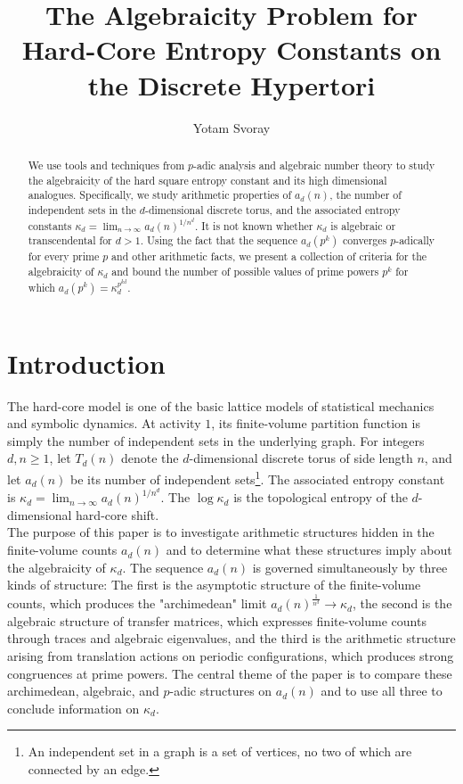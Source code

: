 \documentclass{article}
\title{The Algebraicity Problem for Hard-Core Entropy Constants on the Discrete Hypertori}
\author{Yotam Svoray}
\date{ }
\theoremstyle{plain}
\theoremstyle{definition}
\theoremstyle{remark}
\begin{document}
\maketitle

\begin{abstract}
 We use tools and techniques from $p$-adic analysis and algebraic number theory to study the algebraicity of the hard square entropy constant and its high dimensional analogues. Specifically, we study arithmetic properties of $a_d(n)$, the number of independent sets in the $d$-dimensional discrete torus, and the associated entropy constants $\kappa_d=\lim_{n\to\infty}a_d(n)^{1/n^d}$. It is not known whether $\kappa_d$ is algebraic or transcendental for $d>1$. Using the fact that the sequence $a_d(p^k)$ converges $p$-adically for every prime $p$ and other arithmetic facts, we present a collection of criteria for the algebraicity of $\kappa_d$ and bound the number of possible values of prime powers $p^k$ for which $a_d(p^k)=\kappa_d^{p^{kd}}$. 
\end{abstract}

\tableofcontents

\section{Introduction}

The hard-core model is one of the basic lattice models of statistical
mechanics and symbolic dynamics. At activity $1$, its finite-volume partition
function is simply the number of independent sets in the underlying graph.
For integers $d,n\geq1$, let $T_d(n)$ denote the $d$-dimensional discrete
torus of side length $n$, and let $a_d(n)$ be its number of independent
sets\footnote{An independent set in a graph is a set of vertices, no two of which are connected by an edge.}. The associated entropy constant is $\kappa_d=\lim_{n\to\infty}a_d(n)^{1/n^d}$. The $\log\kappa_d$ is the topological entropy of the
$d$-dimensional hard-core shift.\\

The purpose of this paper is to investigate arithmetic structures hidden in
the finite-volume counts $a_d(n)$ and to determine what these structures
imply about the algebraicity of $\kappa_d$. The sequence $a_d(n)$ is governed
simultaneously by three kinds of structure: The first is the asymptotic
structure of the finite-volume counts, which produces the "archimedean" limit $a_d(n)^{\frac{1}{n^d}} \to \kappa_d$, the second
is the algebraic structure of transfer matrices, which expresses
finite-volume counts through traces and algebraic eigenvalues, and the third
is the arithmetic structure arising from translation actions on periodic
configurations, which produces strong congruences at prime powers. The
central theme of the paper is to compare these archimedean, algebraic, and
$p$-adic structures on $a_d(n)$ and to use all three to conclude information on $\kappa_d$.\\
\end{document}
